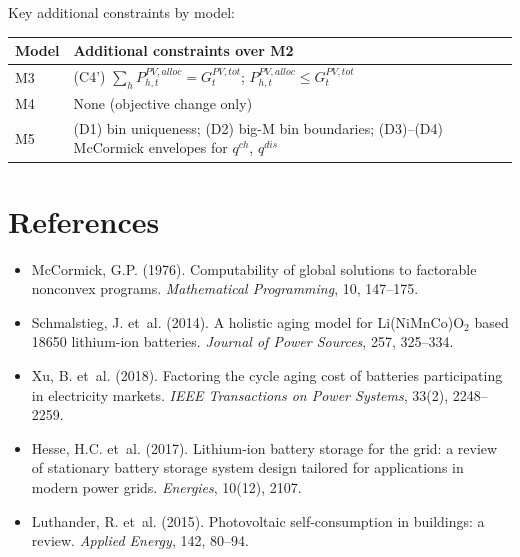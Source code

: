 \documentclass{article}
\begin{document}
\bigskip
\noindent
Key additional constraints by model:

\begin{center}
\renewcommand{\arraystretch}{1.4}
\begin{tabular}{lp{9cm}}
\toprule
Model & Additional constraints over M2 \\
\midrule
M3 & (C4') $\sum_h P^{PV,alloc}_{h,t} = G^{PV,tot}_t$;
         $P^{PV,alloc}_{h,t} \le G^{PV,tot}_t$ \\
M4 & None (objective change only) \\
M5 & (D1) bin uniqueness;
     (D2) big-M bin boundaries;
     (D3)--(D4) McCormick envelopes for $q^{ch}$, $q^{dis}$ \\
\bottomrule
\end{tabular}
\end{center}

\section*{References}

\begin{itemize}
  \item McCormick, G.P. (1976). Computability of global solutions to
    factorable nonconvex programs. \textit{Mathematical Programming}, 10,
    147--175.
  \item Schmalstieg, J. et~al. (2014). A holistic aging model for
    Li(NiMnCo)O$_2$ based 18650 lithium-ion batteries.
    \textit{Journal of Power Sources}, 257, 325--334.
  \item Xu, B. et~al. (2018). Factoring the cycle aging cost of batteries
    participating in electricity markets.
    \textit{IEEE Transactions on Power Systems}, 33(2), 2248--2259.
  \item Hesse, H.C. et~al. (2017). Lithium-ion battery storage for the grid:
    a review of stationary battery storage system design tailored for
    applications in modern power grids.
    \textit{Energies}, 10(12), 2107.
  \item Luthander, R. et~al. (2015). Photovoltaic self-consumption in
    buildings: a review. \textit{Applied Energy}, 142, 80--94.
\end{itemize}
\end{document}
